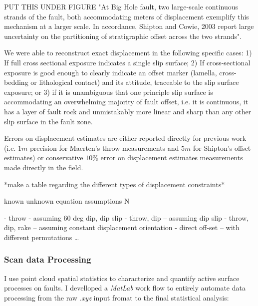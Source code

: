 \documentclass[12pt,a4paper]{article}
\begin{document}
 PUT THIS UNDER FIGURE "At Big Hole fault, two large-scale continuous strands of the fault, both accommodating meters of displacement exemplify this mechanism at a larger scale. In accordance, Shipton and Cowie, 2003 report large uncertainty on the partitioning of stratigraphic offset across the two strands".

We were able to reconstruct exact displacement in the following specific cases: 1) If full cross sectional exposure indicates a single slip surface; 2) If cross-sectional exposure is good enough to clearly indicate an offset marker (lamella, cross-bedding or lithological contact) and its attitude, traceable to the slip surface exposure; or 3) if it is unambiguous that one principle slip surface is accommodating an overwhelming majority of fault offset, i.e. it is continuous, it has a layer of fault rock and unmistakably more linear and sharp than any other slip surface in the fault zone. 

Errors on displacement estimates are either reported directly for previous work (i.e. $1m$ precision for Maerten's throw measurements and $5m$ for Shipton's offset estimates) or conservative $10\%$ error on displacement estimates measurements made directly in the field. 

*make a table regarding the different types of displacement constraints*

known 		unknown 	equation 	assumptions		N

- throw - assuming 60 deg dip, dip slip 
- throw, dip – assuming dip slip 
- throw, dip, rake – assuming constant displacement orientation
- direct off-set – with different permutations …

	\subsubsection{Scan data Processing}

I use point cloud spatial statistics to characterize and quantify active surface processes on faults. I develloped a \textit{MatLab} work flow to entirely automate data processing from the raw \textit{.xyz} input fromat to the final statistical analysis:
\end{document}
